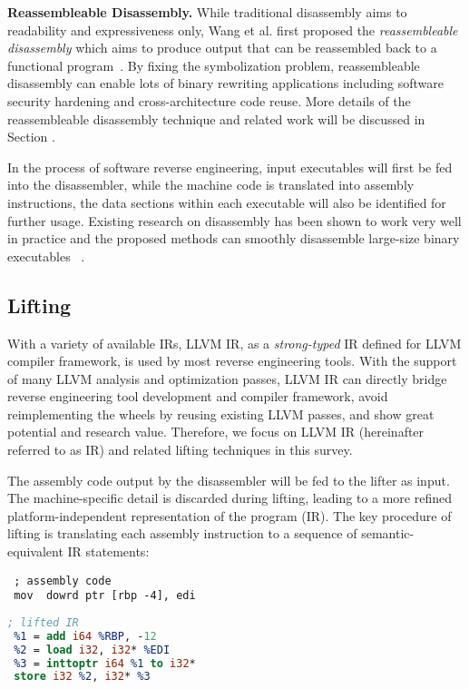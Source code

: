 \noindent \textbf{Reassembleable Disassembly.} While traditional disassembly
aims to readability and expressiveness only, Wang et al. first proposed the
\textit{reassembleable disassembly} which aims to produce output that can be
reassembled back to a functional program~\cite{wang2015reassembleable}. By
fixing the symbolization problem, reassembleable disassembly can enable lots
of binary rewriting applications including software security hardening and
cross-architecture code reuse. More details of the reassembleable disassembly
technique and related work will be discussed in Section .

In the process of software reverse engineering, input executables will first be
fed into the disassembler, while the machine code is translated into assembly
instructions, the data sections within each executable will also be identified
for further usage. Existing research on disassembly has been shown to work
very well in practice and the proposed methods can smoothly disassemble
large-size binary executables
~\cite{balakrishnan2010wysinwyx,kruegel2004static,wang2015reassembleable}.

\subsection{Lifting} \label{sec:background-lifting}

With a variety of available IRs, LLVM IR, as a \textit{strong-typed} IR
defined for LLVM compiler framework, is used by most reverse engineering
tools. With the support of many LLVM analysis and optimization passes, LLVM IR
can directly bridge reverse engineering tool development and compiler
framework, avoid reimplementing the wheels by reusing existing LLVM passes,
and show great potential and research value. Therefore, we focus on LLVM IR
(hereinafter referred to as IR) and related lifting techniques in this survey.

The assembly code output by the disassembler will be fed to the lifter as
input. The machine-specific detail is discarded during lifting, leading to a
more refined platform-independent representation of the program (IR). The key
procedure of lifting is translating each assembly instruction to a sequence of
semantic-equivalent IR statements:

\vspace*{3pt}
\noindent\hspace*{36pt}\begin{minipage}{.40\linewidth}
\begin{lstlisting}
 ; assembly code
 mov  dowrd ptr [rbp -4], edi
\end{lstlisting}
\end{minipage}\hspace*{24pt}
\begin{minipage}{.40\linewidth}
\begin{lstlisting}[language=llvm]
 ; lifted IR
 %1 = add i64 %RBP, -12
 %2 = load i32, i32* %EDI
 %3 = inttoptr i64 %1 to i32*
 store i32 %2, i32* %3
\end{lstlisting}
\end{minipage}

